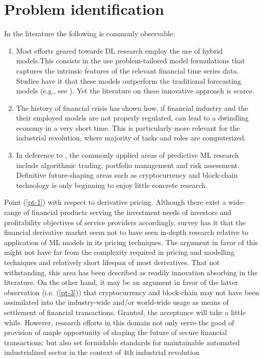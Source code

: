 \documentclass[a4paper,11pt]{scrartcl}
\newcommand{\eg}{e.g.}
\begin{document}
\section{Problem identification}
In the literature the following is commonly observable:
\begin{enumerate}
    \item \label{pt-1} Most efforts geared towards DL research employ the use of hybrid models.This consists in the use problem-tailored model formulations that captures the intrinsic features of the relevant financial time series data. Studies have it that these models outperform the traditional forecasting models (\eg, see \citep{ozbayoglu2020deep}). Yet the literature on these innovative approach is scarce.
    \item \label{pt-2} The history of financial crisis has shown how, if financial industry and the their employed models are not properly regulated, can lead to a dwindling economy in a very short time. This is particularly more relevant for the industrial revolution, where majority of tasks and roles are computerized.
    \item \label{pt-3} In deference to \citep{sezer2020financial}, the commonly applied areas of predictive ML research include algorithmic trading, portfolio management and risk assessment. Definitive future-shaping areas such as cryptocurrency and block-chain technology is only beginning to enjoy little concrete research.
\end{enumerate}

Point (\ref{pt-1}) with respect to derivative pricing. Although there exist a wide-range of financial products serving the investment needs of investors and profitability objectives of service providers accordingly, survey has it that the financial derivative market seem not to have seen in-depth research relative to application of ML models in its pricing techniques. The argument in favor of this might not have far from the complexity required in pricing and modelling techniques and relatively short lifespan of most derivatives. That not withstanding, this area has been described as readily innovation absorbing in the literature.
\newline
On the other hand, it may be an argument in favor of the latter observation (i.e. (\ref{pt-3})) that cryptocurrency and block-chain may not have been assimilated into the industry-wide and/or world-wide usage as means of settlement of financial transactions. Granted, the acceptance will take a little while. However, research efforts in this domain not only serve the good of provision of ample opportunity of shaping the future of secure financial transactions; but also set formidable standards for maintainable automated  industrialized sector in the context of 4th industrial revolution
%
\end{document}
